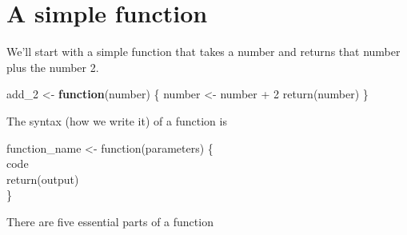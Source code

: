 \documentclass[
  a4paper,
]{krantz}
\makeatletter
\newenvironment{Shaded}{\begin{snugshade}}{\end{snugshade}}
\newcommand{\ControlFlowTok}[1]{\textcolor[rgb]{0.27,0.27,0.27}{\textbf{#1}}}
\newcommand{\DecValTok}[1]{\textcolor[rgb]{0.06,0.06,0.06}{#1}}
\newcommand{\FunctionTok}[1]{\textcolor[rgb]{0,0,0}{#1}}
\newcommand{\NormalTok}[1]{#1}
\newcommand{\OtherTok}[1]{\textcolor[rgb]{0.37,0.37,0.37}{#1}}
\newcommand{\SpecialCharTok}[1]{\textcolor[rgb]{0,0,0}{#1}}
\newenvironment{kframe}{%
\medskip{}
\setlength{\fboxsep}{.8em}
 \def\at@end@of@kframe{}%
 \ifinner\ifhmode%
  \def\at@end@of@kframe{\end{minipage}}%
  \begin{minipage}{\columnwidth}%
 \fi\fi%
 \def\FrameCommand##1{\hskip\@totalleftmargin \hskip-\fboxsep
 \colorbox{shadecolor}{##1}\hskip-\fboxsep
     \hskip-\linewidth \hskip-\@totalleftmargin \hskip\columnwidth}%
 \MakeFramed {\advance\hsize-\width
   \@totalleftmargin\z@ \linewidth\hsize
   \@setminipage}}%
 {\par\unskip\endMakeFramed%
 \at@end@of@kframe}
\renewenvironment{Shaded}{\begin{kframe}}{\end{kframe}}
\makeatother
\begin{document}
\hypertarget{a-simple-function}{%
\section{A simple function}\label{a-simple-function}}

We'll start with a simple function that takes a number and
returns that number plus the number 2.

\begin{Shaded}
\begin{Highlighting}[]
\NormalTok{add\_2 }\OtherTok{\textless{}{-}} \ControlFlowTok{function}\NormalTok{(number) \{}
\NormalTok{  number }\OtherTok{\textless{}{-}}\NormalTok{ number }\SpecialCharTok{+} \DecValTok{2}
  \FunctionTok{return}\NormalTok{(number)}
\NormalTok{\}}
\end{Highlighting}
\end{Shaded}

The syntax (how we write it) of a function is

function\_name \textless- function(parameters) \{\\
code\\
return(output)\\
\}

There are five essential parts of a function
\end{document}
